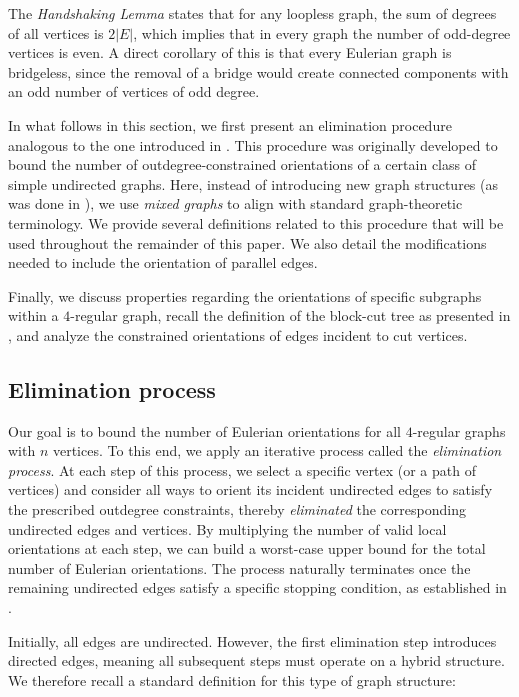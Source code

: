 \documentclass{article}
\begin{document}
        The \emph{Handshaking Lemma} states that for any loopless graph, the sum of degrees of all vertices is $2|E|$, which implies that in every graph the number of odd-degree vertices is even.
        A direct corollary of this is that every Eulerian graph is bridgeless, since the removal of a bridge would create connected components with an odd number of vertices of odd degree.
        
        In what follows in this section, we first present an elimination procedure analogous to the one introduced in \cite{bev,bet}.
        This procedure was originally developed to bound the number of outdegree-constrained orientations of a certain class of simple undirected graphs.
        Here, instead of introducing new graph structures (as was done in \cite{bev}), we use \emph{mixed graphs} to align with standard graph-theoretic terminology.
        We provide several definitions related to this procedure that will be used throughout the remainder of this paper.
        We also detail the modifications needed to include the orientation of parallel edges.
        
        Finally, we discuss properties regarding the orientations of specific subgraphs within a $4$-regular graph, recall the definition of the block-cut tree as presented in \cite{Harary69}, and analyze the constrained orientations of edges incident to cut vertices.

    \subsection{Elimination process}\label{sec:elim}
        Our goal is to bound the number of Eulerian orientations for all $4$-regular graphs with $n$ vertices.
        To this end, we apply an iterative process called the \emph{elimination process}.
        At each step of this process, we select a specific vertex (or a path of vertices) and consider all ways to orient its incident undirected edges to satisfy the prescribed outdegree constraints, thereby \emph{eliminated} the corresponding undirected edges and vertices.
        By multiplying the number of valid local orientations at each step, we can build a worst-case upper bound for the total number of Eulerian orientations.
        The process naturally terminates once the remaining undirected edges satisfy a specific stopping condition, as established in \cite{bev}.
        
        Initially, all edges are undirected.
        However, the first elimination step introduces directed edges, meaning all subsequent steps must operate on a hybrid structure. 
        We therefore recall a standard definition for this type of graph structure:
\end{document}
